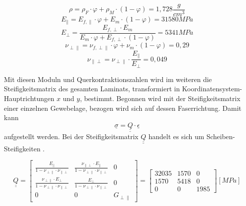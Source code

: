 \begin{equation}
	\rho=\rho_{F}\cdot\varphi +\rho_{M}\cdot (1-\varphi)=1,728\frac{g}{cm^{3}}
\end{equation}
\begin{equation}
	E_{\parallel}=E_{f,\parallel}\cdot \varphi+E_{m}\cdot (1-\varphi)=31580 MPa
\end{equation}
\begin{equation}
	E_{\perp}=\frac{E_{f,\perp}\cdot E_{m}}{E_{m}\cdot \varphi+E_{f,\perp}\cdot (1-\varphi)}=5341MPa
\end{equation}
\begin{equation}
	\nu_{\perp\parallel}=\nu_{f,\perp\parallel}\cdot\varphi+\nu_{m}\cdot(1-\varphi)=0,29
\end{equation}
\begin{equation}
	\nu_{\parallel\perp}=\nu_{\perp\parallel}\cdot\frac{E_{\parallel}}{E_{\perp}}=0,049
\end{equation}

\noindent Mit diesen Moduln und Querkontraktionszahlen wird im weiteren die Steifigkeitsmatrix des gesamten Laminats, transformiert in Koordinatensystem-Hauptrichtungen $x$ und $y$, bestimmt. Begonnen wird mit der Steifigkeitsmatrix einer einzelnen Gewebelage, bezogen wird sich auf dessen Faserrichtung. Damit kann  
\begin{equation}
	\underline{\sigma}=\underline{\underline{Q}} \cdot \underline{\epsilon}
\end{equation}
aufgestellt werden. Bei der Steifigkeitsmatrix $\underline{\underline{Q}}$ handelt es sich um Scheiben-Steifigkeiten \cite{item3}.

\begin{equation}
\underline{\underline{Q}}=
\begin{bmatrix}
	\frac{E_{\|}}{1-\nu_{\perp \|}\cdot \nu_{\| \perp}}&	\frac{\nu_{\| \perp}\cdot E_{\|}}{1-\nu_{\perp \|}\cdot \nu_{\| \perp}}&0\\
	
	\frac{\nu_{\perp \|}\cdot E_{\perp}}{1-\nu_{\perp \|}\cdot \nu_{\| \perp}}&\frac{E_{\perp}}{1-\nu_{\perp \|}\cdot \nu_{\| \perp}}&0\\
	
	0&0&G_{\perp\parallel}
\end{bmatrix} =
\begin{bmatrix}
	32035 & 1570 & 0\\
	1570 & 5418 & 0\\
	0 & 0 & 1985
\end{bmatrix} [MPa]
\end{equation}\\

